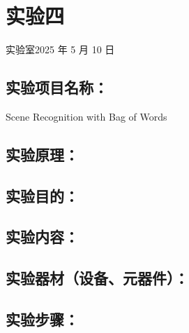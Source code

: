 \documentclass[a4paper,11pt,UTF8,AutoFakeBold]{ctexart}
\begin{document}
\xiaosihao {}  

\author{谢卿云}
\teacher{}

\maketitle

\chapter{实验四}{实验室}{2025 年 5 月 10 日}           %

\section{实验项目名称：}
Scene Recognition with Bag of Words

\section{实验原理：}






\section{实验目的：}


\section{实验内容：}


\section{实验器材（设备、元器件）：}


\section{实验步骤：}

\end{document}
